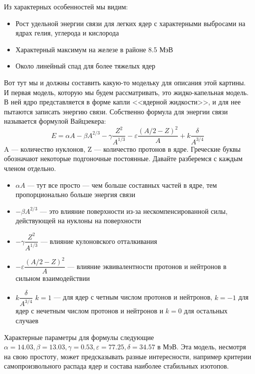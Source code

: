 \documentclass[12pt]{article}
\begin{document}
\noindent
Из характерных особенностей мы видим:
\begin{itemize}
    \item Рост удельной энергии связи для легких ядер с характерными выбросами на ядрах гелия, углерода и кислорода
    \item Характерный максимум на железе в районе 8.5 МэВ
    \item Около линейный спад для более тяжелых ядер
\end{itemize}
Вот тут мы и должны составить какую-то модельку для описания этой картины. И первая модель, которую мы будем рассматривать, это жидко-капельная модель. В ней ядро представляется в форме капли <<ядерной жидкости>>, и для нее пытаются записать энергию связи. Собственно формула для энергии связи называется формулой Вайцзекера:
\begin{equation}
    E=\alpha A - \beta A^{2/3} - \gamma \dfrac{Z^2}{A^{1/3}} - \varepsilon \dfrac{(A/2-Z)^2}{A} + k\dfrac{\delta}{A^{3/4}}
\end{equation}
A --- количество нуклонов, Z --- количество протонов в ядре. Греческие буквы обозначают некоторые подгоночные постоянные. Давайте разберемся с каждым членом отдельно.
\begin{itemize}
    \item $\alpha A$ --- тут все просто --- чем больше составных частей в ядре, тем пропорционально больше энергия связи
    \item $-\beta A^{2/3}$ --- это влияние поверхности из-за нескомпенсированной силы, действующей на нуклоны на поверхности
    \item $-\gamma \dfrac{Z^2}{A^{1/3}}$ --- влияние кулоновского отталкивания
    \item $-\varepsilon \dfrac{(A/2-Z)^2}{A}$ --- влияние эквивалентности протонов и нейтронов в сильном взаимодействии
    \item $k\dfrac{\delta}{A^{3/4}}$ $k=1$ --- для ядер с четным числом \vspace{1mm} протонов и нейтронов, $k=-1$ для ядер с нечетным числом протонов и нейтронов и $k=0$ для остальных случаев
\end{itemize}
Характерные параметры для формулы следующие $\alpha = 14.03, \beta = 13.03, \gamma = 0.53, \varepsilon = 77.25, \delta = 34.57$ в МэВ. Эта модель, несмотря на свою простоту, может предсказывать разные интересности, например критерии самопроизвольного распада ядер и состава наиболее стабильных изотопов.
\end{document}
